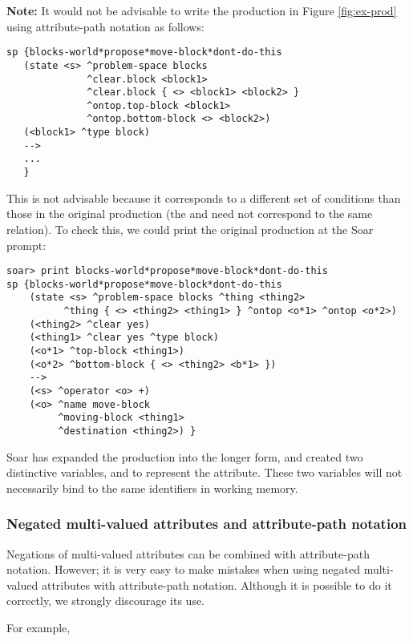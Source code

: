 \textbf{Note:} It would not be advisable to write the production in Figure
\ref{fig:ex-prod} using attribute-path notation as follows:

\begin{verbatim}
sp {blocks-world*propose*move-block*dont-do-this
   (state <s> ^problem-space blocks
              ^clear.block <block1>
              ^clear.block { <> <block1> <block2> }
              ^ontop.top-block <block1>
              ^ontop.bottom-block <> <block2>)
   (<block1> ^type block)
   -->
   ...
   }
\end{verbatim}

This is not advisable because it corresponds to a different set of conditions
than those in the original production (the  and
 need not correspond to the same  relation).
To check this, we could print the original production at the Soar prompt:

\begin{verbatim}
soar> print blocks-world*propose*move-block*dont-do-this
sp {blocks-world*propose*move-block*dont-do-this
    (state <s> ^problem-space blocks ^thing <thing2>
          ^thing { <> <thing2> <thing1> } ^ontop <o*1> ^ontop <o*2>)
    (<thing2> ^clear yes)
    (<thing1> ^clear yes ^type block)
    (<o*1> ^top-block <thing1>)
    (<o*2> ^bottom-block { <> <thing2> <b*1> })
    -->
    (<s> ^operator <o> +)
    (<o> ^name move-block 
         ^moving-block <thing1> 
         ^destination <thing2>) }
\end{verbatim}

Soar has expanded the production into the longer form, and created two
distinctive variables,  and  to represent the
 attribute. These two variables will not necessarily bind to the
same identifiers in working memory.

\subsubsection*{Negated multi-valued attributes and attribute-path notation}

Negations of multi-valued attributes can be combined with attribute-path
notation. However; it is very easy to make mistakes when using negated
multi-valued attributes with attribute-path notation. Although it is
possible to do it correctly, we strongly discourage its use.

For example, 

